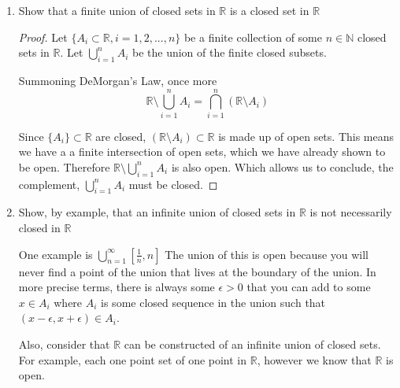 \documentclass{tufte-book}
\theoremstyle{mytheoremstyle}
\theoremstyle{mylemstyle}
\theoremstyle{mydefstyle}
\begin{document}
\begin{enumerate}
\begin{proof}
By definition $\mathbb{R} \setminus \bigcap\limits_{i \in I} A_i = \bigcup\limits_{i \in I} (\mathbb{R} \setminus A_i)$.

Since $\{A_i\} \subset \mathbb{R}$ are closed, $(\mathbb{R} \setminus A_i) \subset \mathbb{R}$ is made up of open sets.  So we have an arbitrary union of open sets in $\mathbb{R}$ which we have already shown to be open.  This means  $\mathbb{R} \setminus \bigcap\limits_{i \in I} A_i$ is also open.  Therefore it's compliment $\bigcap\limits_{i \in I}A_i$ is closed.

\end{proof}

\item Show that a finite union of closed sets in $\mathbb{R}$ is a closed set in $\mathbb{R}$
\begin{proof}

Let $\{A_i \subset \mathbb{R}, i=1, 2,...,n\}$ be a finite collection of some $n \in \mathbb{N}$ closed sets in $\mathbb{R}$.  Let $\bigcup\limits_{i=1}^{n}A_i$ be the union of the finite closed subsets.

Summoning DeMorgan's Law, once more
\[\mathbb{R} \setminus \bigcup\limits_{i=1}^{n} A_i = \bigcap\limits_{i=1}^{n}(\mathbb{R} \setminus A_i)\]

Since $\{A_i\} \subset \mathbb{R}$ are closed, $(\mathbb{R} \setminus A_i) \subset \mathbb{R}$ is made up of open sets.  This means we have a a finite intersection of open sets, which we have already shown to be open.  Therefore $\mathbb{R} \setminus \bigcup\limits_{i=1}^{n} A_i $ is also open.  Which allows us to conclude, the complement,  $\bigcup\limits_{i=1}^{n} A_i $ must be closed.

\end{proof}

\item Show, by example, that an infinite union of closed sets in $\mathbb{R}$ is not necessarily closed in $\mathbb{R}$

One example is $\bigcup\limits_{n=1}^{\infty}[\frac{1}{n}, n]$  The union of this is open because you will never find a point of the union that lives at the boundary of the union.  In more precise terms, there is always some $\epsilon > 0$ that you can add to some $x \in A_i$ where $A_i$ is some closed sequence in the union such that $(x - \epsilon, x+\epsilon) \in A_i$.

Also, consider that $\mathbb{R}$ can be constructed of an infinite union of closed sets.   For example, each one point set of one point in $\mathbb{R}$, however we know that $\mathbb{R}$ is open.
\end{enumerate}
\end{document}
